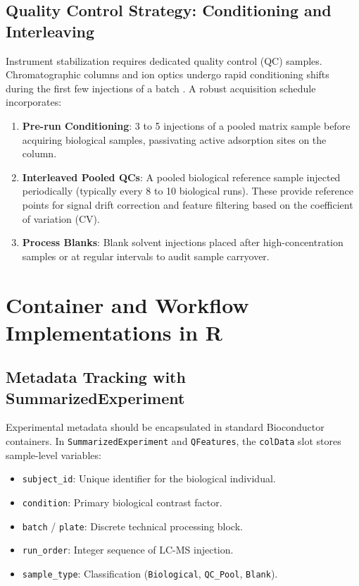 \documentclass[11pt,twoside,openright]{book}
\begin{document}
\subsection{Quality Control Strategy: Conditioning and Interleaving}

Instrument stabilization requires dedicated quality control (QC) samples. Chromatographic columns and ion optics undergo rapid conditioning shifts during the first few injections of a batch \cite{broadhurst2018guidelines}. A robust acquisition schedule incorporates:
\begin{enumerate}
    \item \textbf{Pre-run Conditioning}: 3 to 5 injections of a pooled matrix sample before acquiring biological samples, passivating active adsorption sites on the column.
    \item \textbf{Interleaved Pooled QCs}: A pooled biological reference sample injected periodically (typically every 8 to 10 biological runs). These provide reference points for signal drift correction and feature filtering based on the coefficient of variation (CV).
    \item \textbf{Process Blanks}: Blank solvent injections placed after high-concentration samples or at regular intervals to audit sample carryover.
\end{enumerate}

\section{Container and Workflow Implementations in R}

\subsection{Metadata Tracking with SummarizedExperiment}

Experimental metadata should be encapsulated in standard Bioconductor containers. In \texttt{SummarizedExperiment} and \texttt{QFeatures}, the \texttt{colData} slot stores sample-level variables:
\begin{itemize}
    \item \texttt{subject\_id}: Unique identifier for the biological individual.
    \item \texttt{condition}: Primary biological contrast factor.
    \item \texttt{batch} / \texttt{plate}: Discrete technical processing block.
    \item \texttt{run\_order}: Integer sequence of LC-MS injection.
    \item \texttt{sample\_type}: Classification (\texttt{Biological}, \texttt{QC\_Pool}, \texttt{Blank}).
\end{itemize}
\end{document}
